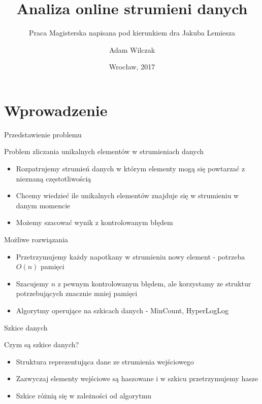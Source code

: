 \documentclass{beamer}
\title[Analiza online strumieni danych]{Analiza online strumieni danych}														\subtitle{Praca Magisterska napisana pod kierunkiem dra Jakuba Lemiesza}
\author[A. Wilczak]{Adam Wilczak}
\institute[]{Politechnika Wrocławska, Wydział Podstawowych Problemów Techniki
}
\date{Wrocław, 2017}
\begin{document}
\begin{frame}
  \titlepage
\end{frame}


\section{Wprowadzenie}

\begin{frame}{Przedstawienie problemu}

\begin{block}{Problem zliczania unikalnych elementów w strumieniach danych}
\begin{itemize}
\item Rozpatrujemy strumień danych w którym elementy mogą się powtarzać z nieznaną częstotliwością
\item Chcemy wiedzieć ile unikalnych elementów znajduje się w strumieniu w danym momencie
\item Możemy szacować wynik z kontrolowanym błędem
\end{itemize}
\end{block}
\begin{block}{Możliwe rozwiązania}
	\begin{itemize}
		\item Przetrzymujemy każdy napotkany w strumieniu nowy element - potrzeba $O(n)$ pamięci
		\item Szacujemy $n$ z pewnym kontrolowanym błędem, ale korzystamy ze struktur potrzebujących znacznie mniej pamięci
		\item Algorytmy operujące na szkicach danych - MinCount, HyperLogLog
	\end{itemize}
\end{block}
\end{frame}

\begin{frame}{Szkice danych}
\begin{block}{Czym są szkice danych?}
	\begin{itemize}
		\item Struktura reprezentująca dane ze strumienia wejściowego
		\item Zazwyczaj elementy wejściowe są haszowane i w szkicu przetrzymujemy hasze
		\item Szkice różnią się w zależności od algorytmu
	\end{itemize}
\end{block}
\end{frame}
\end{document}
